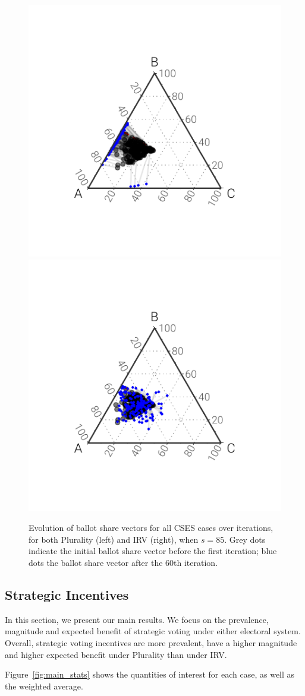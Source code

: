 \documentclass[11pt,a4paper]{article}
\begin{document}
\begin{figure}[]
	\centering
	\includegraphics[width = .49\textwidth]{../../output/figures/tatonnement_plur}
	\includegraphics[width = .49\textwidth]{../../output/figures/tatonnement_rcv}
	\caption{Evolution of ballot share vectors for all CSES cases over iterations, for both Plurality (left) and IRV (right), when $s = 85$. Grey dots indicate the initial ballot share vector before the first iteration; blue dots the ballot share vector after the 60th iteration.}
	\label{fig:convergence_paths}
\end{figure}

\subsection{Strategic Incentives}

In this section, we present our main results. We focus on the prevalence, magnitude and expected benefit of strategic voting under either electoral system. Overall, strategic voting incentives are more prevalent, have a higher magnitude and higher expected benefit under Plurality than under IRV.

Figure~\ref{fig:main_stats} shows the quantities of interest for each case, as well as the weighted average.
\end{document}
